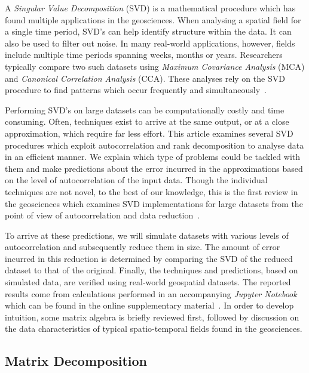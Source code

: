 \documentclass[ijgi,article,submit,moreauthors,pdftex,10pt,a4paper]{Definitions/mdpi}
\begin{document}
A \textit{Singular Value Decomposition} (SVD) is a mathematical procedure which has found multiple applications in the geosciences. When analysing a spatial field for a single time period, SVD's can help identify structure within the data. It can also be used to filter out noise. In many real-world applications, however, fields include multiple time periods spanning weeks, months or years. Researchers typically compare two such datasets using \textit{Maximum Covariance Analysis} (MCA) and \textit{Canonical Correlation Analysis} (CCA). These analyses rely on the SVD procedure to find patterns which occur frequently and simultaneously~\cite{Eshel2011, Storch1999}.

Performing SVD's on large datasets can be computationally costly and time consuming. Often, techniques exist to arrive at the same output, or at a close approximation, which require far less effort. This article examines several SVD procedures which exploit autocorrelation and rank decomposition to analyse data in an efficient manner. We explain which type of problems could be tackled with them and make predictions about the error incurred in the approximations based on the level of autocorrelation of the input data. Though the individual techniques are not novel, %
to the best of our knowledge, this is the first review in the geosciences which examines SVD implementations for large datasets from the point of view of autocorrelation and data reduction~\cite{Golub1970, Bjorck1973, Chan1982}.

To arrive at these predictions, we will simulate datasets with various levels of autocorrelation and subsequently reduce them in size. The amount of error incurred in this reduction is determined by comparing the SVD of the reduced dataset to that of the original. Finally, the techniques and predictions, based on simulated data, are verified using real-world geospatial datasets. The reported results come from calculations performed in an accompanying \textit{Jupyter Notebook} which can be found in the online supplementary material~\cite{Bogaardt2018}. In order to develop intuition, some matrix algebra is briefly reviewed first, followed by discussion on the data characteristics of typical spatio-temporal fields found in the geosciences.

\subsection{Matrix Decomposition}
\label{sec:Introduction/Matrix Decomposition} %
\end{document}
